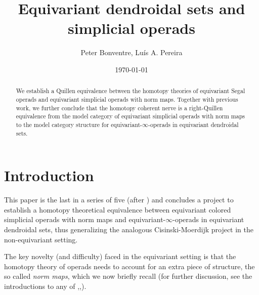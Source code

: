 \documentclass[a4paper,10pt
,draft
]{article}%
\title{Equivariant dendroidal sets and simplicial operads}
\author{Peter Bonventre, Lu\'is A. Pereira}%
\date{\today}
\numberwithin{equation}{section}
\numberwithin{figure}{section}
\theoremstyle{definition} %
\newcommand{\1}{\ensuremath{\mathbbm 1}}%
\begin{document}
\maketitle

\begin{abstract}
	We establish a Quillen equivalence between the homotopy theories of 
	equivariant Segal operads and equivariant simplicial operads with norm maps.
	Together with previous work, 
	we further conclude that the homotopy coherent nerve
	is a right-Quillen equivalence from the 
	model category of
	equivariant simplicial operads with norm maps
	to the
	model category structure
	for equivariant-$\infty$-operads in equivariant dendroidal sets.
\end{abstract}

\tableofcontents


\section{Introduction}



This paper is the last in a series of five
(after \cite{Per18,BP_edss,BP_FCOP,BP_ACOP})
and concludes a project to establish a homotopy theoretical equivalence
between equivariant colored simplicial operads with norm maps
and equivariant-$\infty$-operads in equivariant dendroidal sets,
thus generalizing the analogous 
Cisinski-Moerdijk project 
\cite{CM13a,CM13b,CM11}
in the non-equivariant setting.

The key novelty (and difficulty) faced in the equivariant setting is that the homotopy theory of operads
needs to account for an 
extra piece of structure,
the so called \emph{norm maps},
which we now briefly recall
(for further discussion, 
see the introductions to any of
\cite{Per18},\cite{BP_geo},\cite{BP_FCOP}).
\end{document}
